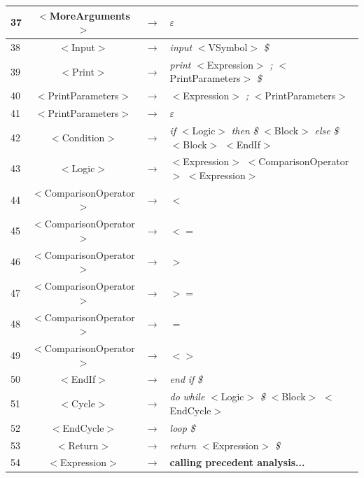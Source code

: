\documentclass[10pt,a4paper,titlepage]{article}
\begin{document}
{\begin{center}
\begin{tabular}{ | l | c  c  l | }
      37 & $<$MoreArguments$>$            & $\rightarrow$ & $\varepsilon$ \\ \hline
      38 & $<$Input$>$                    & $\rightarrow$ & {\it input} $<$VSymbol$>$ {\it \$} \\ \hline
      39 & $<$Print$>$                    & $\rightarrow$ & {\it print} $<$Expression$>$ {\it ;} $<$PrintParameters$>$ {\it \$} \\ \hline
      40 & $<$PrintParameters$>$          & $\rightarrow$ & $<$Expression$>$ {\it ;} $<$PrintParameters$>$ \\ \hline
      41 & $<$PrintParameters$>$          & $\rightarrow$ & $\varepsilon$ \\ \hline
      42 & $<$Condition$>$                & $\rightarrow$ & {\it if} $<$Logic$>$ {\it then} {\it \$} $<$Block$>$ {\it else} {\it \$} $<$Block$>$ $<$EndIf$>$ \\ \hline
      43 & $<$Logic$>$                    & $\rightarrow$ & $<$Expression$>$ $<$ComparisonOperator$>$ $<$Expression$>$ \\ \hline
      44 & $<$ComparisonOperator$>$       & $\rightarrow$ & {\it $<$} \\ \hline
      45 & $<$ComparisonOperator$>$       & $\rightarrow$ & {\it $<=$} \\ \hline
      46 & $<$ComparisonOperator$>$       & $\rightarrow$ & {\it $>$} \\ \hline
      47 & $<$ComparisonOperator$>$       & $\rightarrow$ & {\it $>=$} \\ \hline
      48 & $<$ComparisonOperator$>$       & $\rightarrow$ & {\it $=$} \\ \hline
      49 & $<$ComparisonOperator$>$       & $\rightarrow$ & {\it $<>$} \\ \hline
      50 & $<$EndIf$>$                    & $\rightarrow$ & {\it end} {\it if} {\it \$} \\ \hline
      51 & $<$Cycle$>$                    & $\rightarrow$ & {\it do} {\it while} $<$Logic$>$ {\it \$} $<$Block$>$ $<$EndCycle$>$ \\ \hline
      52 & $<$EndCycle$>$                 & $\rightarrow$ & {\it loop} {\it \$} \\ \hline
      53 & $<$Return$>$                   & $\rightarrow$ & {\it return} $<$Expression$>$ {\it \$} \\ \hline
      54 & $<$Expression$>$               & $\rightarrow$ & {\bf calling precedent analysis...} \\ \hline
    \end{tabular}
  \end{center}
}
\end{document}
